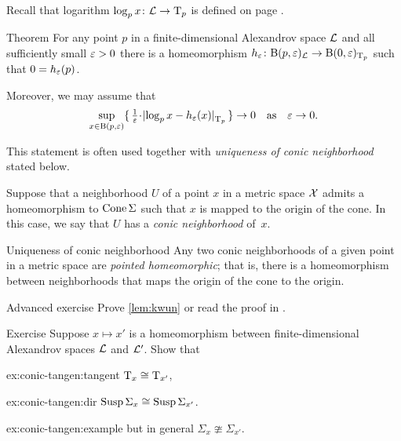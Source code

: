 Recall that logarithm $\log_px\colon\mathcal{L}\to \mathrm{T}_p$ is defined on page \pageref{page:log}.

\begin{thm}{Theorem}\label{thm:spherical-nbhd}
For any point $p$ in a finite-dimensional Alexandrov space $\mathcal{L}$
and all sufficiently small $\varepsilon>0$
there is a homeomorphism $h_\varepsilon\colon\mathrm{B}{}(p,\varepsilon)_{\mathcal{L}}\to \mathrm{B}{}(0,\varepsilon)_{\mathrm{T}_p}$ such that $0=h_\varepsilon(p)$.

Moreover, we may assume that 
\[
\sup_{x\in \oBall(p,\eps)}\{\,\tfrac1\eps\cdot\dist{\log_px}{h_\eps(x)}{\T_p}\,\}\to 0
\quad\text{as}\quad
\eps\to 0.\]
\end{thm}

This statement is often used together with \textit{uniqueness of conic neighborhood} stated below.

Suppose that a neighborhood $U$ of a point $x$ in a metric space $\mathcal{X}$
admits a homeomorphism to $\mathop{\rm Cone}\nolimits\Sigma$ such that $x$ is mapped to the origin of the cone.
In this case, we say that $U$ has a \emph{conic neighborhood} of~$x$.

\begin{thm}{Uniqueness of conic neighborhood}\label{lem:kwun}
Any two conic neighborhoods of a given point in a metric space are \emph{pointed homeomorphic}; that is, there is a homeomorphism between neighborhoods that maps the origin of the cone to the origin.
\end{thm}

\begin{thm}{Advanced exercise}\label{ex:conic}
Prove \ref{lem:kwun} or read the proof in \cite{kwun1964}.
\end{thm}


\begin{thm}{Exercise}\label{ex:conic-tangent}
Suppose $x\mapsto x'$ is a homeomorphism between finite-dimensional Alexandrov spaces $\mathcal{L}$ and $\mathcal{L}'$. Show that 

\begin{subthm}{ex:conic-tangen:tangent}
$\mathrm{T}_x\cong \mathrm{T}_{x'}$,
\end{subthm}

\begin{subthm}{ex:conic-tangen:dir}
$\mathop{\rm Susp}\nolimits\Sigma_x\cong \mathop{\rm Susp}\nolimits\Sigma_{x'}$.
\end{subthm}

\begin{subthm}{ex:conic-tangen:example}
but in general $\Sigma_x\ncong\Sigma_{x'}$.
\end{subthm}

\end{thm}



